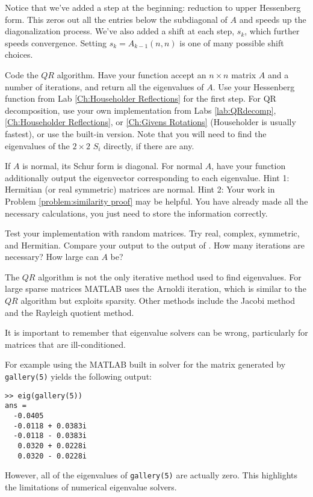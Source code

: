 Notice that we've added a step at the beginning: reduction to upper Hessenberg form. This zeros out all the entries below the subdiagonal of $A$ and speeds up the diagonalization process. We've also added a shift at each step, $s_k$, which further speeds convergence. Setting $s_k = A_{k-1}(n,n)$ is one of many possible shift choices.

\begin{problem}
Code the $QR$ algorithm. Have your function accept an $n \times n$ matrix $A$ and a number of iterations, and return all the eigenvalues of $A$. Use your Hessenberg function from Lab \ref{Ch:Householder Reflections} for the first step. For QR decomposition, use your own implementation from Labs \ref{lab:QRdecomp}, \ref{Ch:Householder Reflections}, or \ref{Ch:Givens Rotations} (Householder is usually fastest), or use the built-in version. Note that you will need to find the eigenvalues of the $2 \times 2$ $S_i$ directly, if there are any.
\end{problem}

\begin{problem}
If $A$ is normal, its Schur form is diagonal. For normal $A$, have your function additionally output the eigenvector corresponding to each eigenvalue. Hint 1: Hermitian (or real symmetric) matrices are normal. Hint 2: Your work in Problem \ref{problem:similarity proof} may be helpful. You have already made all the necessary calculations, you just need to store the information correctly.
\end{problem}

\begin{problem}
Test your implementation with random matrices. Try real, complex, symmetric, and Hermitian. Compare your output to the output of . How many iterations are necessary? How large can $A$ be?
\end{problem}

The $QR$ algorithm is not the only iterative method used to find eigenvalues. For large sparse matrices MATLAB uses the Arnoldi iteration, which is similar to the $QR$ algorithm but exploits sparsity. Other methods include the Jacobi method and the Rayleigh quotient method.

It is important to remember that eigenvalue solvers can be wrong, particularly for matrices that are ill-conditioned. 
\begin{matlab}
For example using the MATLAB built in solver for the matrix generated by {\tt gallery(5)} yields the following output:
\begin{lstlisting}[style=matlab]
>> eig(gallery(5))
ans =
  -0.0405          
  -0.0118 + 0.0383i
  -0.0118 - 0.0383i
   0.0320 + 0.0228i
   0.0320 - 0.0228i
\end{lstlisting}

However, all of the eigenvalues of {\tt gallery(5)} are actually zero. This highlights the limitations of numerical eigenvalue solvers.
\end{matlab}
